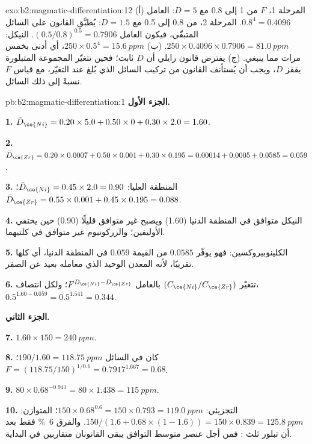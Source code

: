 \begin{solution}{exo:b2:magmatic-differentiation:12}
(أ) المرحلة 1، $F$ من 1 إلى 0.8 مع $D = 5$: العامل $0.8^{4} = 0.4096$. المرحلة 2،
من 0.8 إلى 0.5 مع $D = 1.5$: يُطبَّق القانون على السائل المتبقّي، فيكون
العامل $(0.5/0.8)^{0.5} = 0.7906$. النيكل: $250\times0.4096\times0.7906 =
\qty{81.0}{ppm}$. (ب) $250\times0.5^{4} = \qty{15.6}{ppm}$، أي أدنى بخمس مرات مما ينبغي. (ج)
يفترض قانون رايلي أن $D$ ثابت؛ فحين تتغيّر المجموعة المتبلورة
يقفز $D$، ويجب أن يُستأنف القانون من تركيب السائل الذي بُلغ عند
التغيّر، مع قياس $F$ نسبةً إلى ذلك السائل.
\end{solution}

\begin{solution}{pb:b2:magmatic-differentiation:1}
\noindent\textbf{الجزء الأول.}

\textbf{1.} $\bar D_{\ce{Ni}} = 0.20\times5.0 + 0.50\times0 + 0.30\times2.0 = 1.60$.

\textbf{2.} $\bar D_{\ce{Zr}} = 0.20\times0.0007 + 0.50\times0.001 + 0.30\times0.195 =
0.00014 + 0.0005 + 0.0585 = 0.059$.

\textbf{3.} المنطقة العليا: $\bar D_{\ce{Ni}} = 0.45\times2.0 = 0.90$؛ $\bar D_{\ce{Zr}} =
0.55\times0.001 + 0.45\times0.195 = 0.088$.

\textbf{4.} النيكل متوافق في المنطقة الدنيا (1.60) ويصبح غير متوافق
قليلًا (0.90) حين يختفي الأوليفين؛ والزركونيوم غير متوافق في كلتيهما.

\textbf{5.} الكلينوبيروكسين: فهو يوفّر $0.0585$ من القيمة $0.059$ في المنطقة الدنيا، أي
كلها تقريبًا، لأنه المعدن الوحيد الذي معامله بعيد عن الصفر.

\textbf{6.} تتغيّر $(C_{\ce{Ni}}/C_{\ce{Zr}})$ بالعامل $F^{D_{\ce{Ni}} - D_{\ce{Zr}}}$؛
ولكل انتصاف، $0.5^{1.60 - 0.059} = 0.5^{1.541} = 0.344$.

\noindent\textbf{الجزء الثاني.}

\textbf{7.} $1.60\times150 = \qty{240}{ppm}$.

\textbf{8.} كان في السائل $190/1.60 = \qty{118.75}{ppm}$؛ $F = (118.75/150)^{1/0.6} =
0.7917^{1.667} = 0.68$.

\textbf{9.} $80\times0.68^{-0.941} = 80\times1.438 = \qty{115}{ppm}$.

\textbf{10.} التجزيئي: $150\times0.68^{0.6} = 150\times0.793 = \qty{119.0}{ppm}$؛
المتوازن: $150/(1.6 + 0.68\times(1 - 1.6)) = 150\times0.839 = \qty{125.8}{ppm}$.
والفرق \qty{6}{\percent} فقط بعد أن تبلور ثلث : فمن أجل
عنصر متوسط التوافق يبقى القانونان متقاربين في البداية.


\end{solution}
